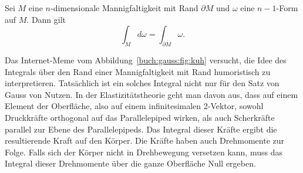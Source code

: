 \begin{satz}[Gauss]
%
Sei $M$ eine $n$-dimensionale Mannigfaltigkeit mit Rand $\partial M$
und $\omega$ eine $n-1$-Form auf $M$.
Dann gilt
\[
\int_M d\omega
=
\int_{\partial M} \omega.
\]
\end{satz}

%
Das Internet-Meme vom Abbildung~\ref{buch:gauss:fig:kuh} versucht,
die Idee des Integrals über den Rand einer Mannigfaltigkeit
mit Rand humoristisch zu interpretieren.
Tatsächlich ist ein solches Integral nicht nur für den Satz von Gauss
von Nutzen.
In der Elastizitätstheorie geht man davon aus, dass auf einem Element
%
der Oberfläche, also auf einem infinitesimalen 2-Vektor, sowohl Druckkräfte
orthogonal auf das Parallelepiped wirken, als auch Scherkräfte parallel 
%
zur Ebene des Parallelepipeds.
Das Integral dieser Kräfte ergibt die resultierende Kraft auf den Körper.
Die Kräfte haben auch Drehmomente zur Folge.
Falls sich der Körper nicht in Drehbewegung versetzen kann, muss
das Integral dieser Drehmomente über die ganze Oberfläche
Null ergeben.

